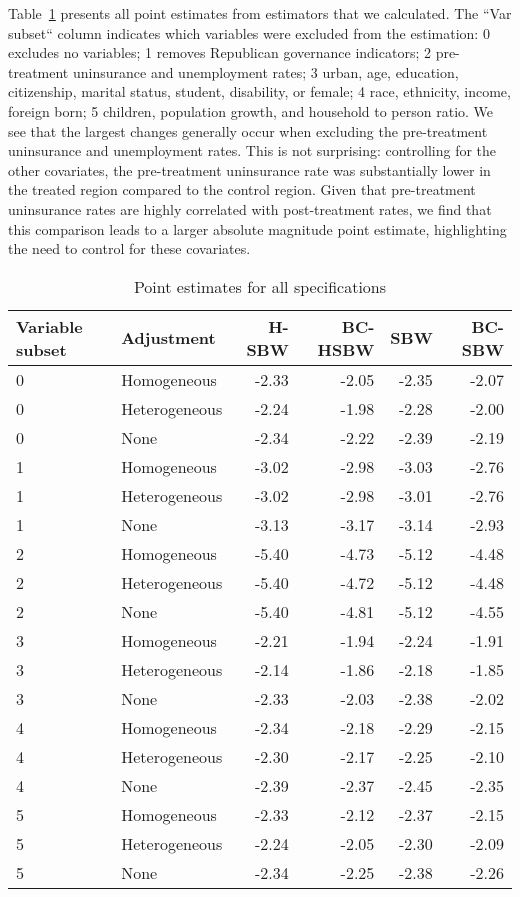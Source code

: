Table~\ref{tab:ptests} presents all point estimates from estimators that we calculated. The ``Var subset`` column indicates which variables were excluded from the estimation: 0 excludes no variables; 1 removes Republican governance indicators; 2 pre-treatment uninsurance and unemployment rates; 3 urban, age, education, citizenship, marital status, student, disability, or female; 4 race, ethnicity, income, foreign born; 5 children, population growth, and household to person ratio. We see that the largest changes generally occur when excluding the pre-treatment uninsurance and unemployment rates. This is not surprising: controlling for the other covariates, the pre-treatment uninsurance rate was substantially lower in the treated region compared to the control region. Given that pre-treatment uninsurance rates are highly correlated with post-treatment rates, we find that this comparison leads to a larger absolute magnitude point estimate, highlighting the need to control for these covariates.

\begin{table}[ht]
\centering
\caption{Point estimates for all specifications}
\label{tab:ptests}
\begin{tabular}{llrrrr}
  \hline
Variable subset & Adjustment & H-SBW & BC-HSBW & SBW & BC-SBW \\ 
  \hline
0 & Homogeneous & -2.33 & -2.05 & -2.35 & -2.07 \\ 
  0 & Heterogeneous & -2.24 & -1.98 & -2.28 & -2.00 \\ 
  0 & None & -2.34 & -2.22 & -2.39 & -2.19 \\ 
  1 & Homogeneous & -3.02 & -2.98 & -3.03 & -2.76 \\ 
  1 & Heterogeneous & -3.02 & -2.98 & -3.01 & -2.76 \\ 
  1 & None & -3.13 & -3.17 & -3.14 & -2.93 \\ 
  2 & Homogeneous & -5.40 & -4.73 & -5.12 & -4.48 \\ 
  2 & Heterogeneous & -5.40 & -4.72 & -5.12 & -4.48 \\ 
  2 & None & -5.40 & -4.81 & -5.12 & -4.55 \\ 
  3 & Homogeneous & -2.21 & -1.94 & -2.24 & -1.91 \\ 
  3 & Heterogeneous & -2.14 & -1.86 & -2.18 & -1.85 \\ 
  3 & None & -2.33 & -2.03 & -2.38 & -2.02 \\ 
  4 & Homogeneous & -2.34 & -2.18 & -2.29 & -2.15 \\ 
  4 & Heterogeneous & -2.30 & -2.17 & -2.25 & -2.10 \\ 
  4 & None & -2.39 & -2.37 & -2.45 & -2.35 \\ 
  5 & Homogeneous & -2.33 & -2.12 & -2.37 & -2.15 \\ 
  5 & Heterogeneous & -2.24 & -2.05 & -2.30 & -2.09 \\ 
  5 & None & -2.34 & -2.25 & -2.38 & -2.26 \\ 
   \hline
\end{tabular}
\end{table}

